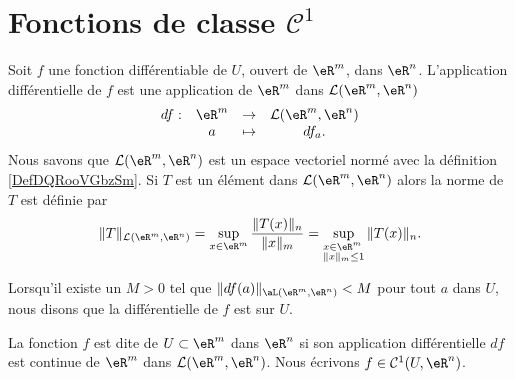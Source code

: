 
\section{Fonctions de classe $\mathcal{C}^1$}

Soit $f$ une fonction différentiable de $U$, ouvert de $\eR^m$, dans $\eR^n$. L'application différentielle de $f$ est une application  de $\eR^m$ dans $\mathcal{L}(\eR^m, \eR^n)$ 
\begin{equation}
  \begin{array}{rccc}
    df : & \eR^m & \to & \mathcal{L}(\eR^m, \eR^n)\\
& a& \mapsto & df_a.
  \end{array}
\end{equation}
Nous savons que $\mathcal{L}(\eR^m, \eR^n)$ est un espace vectoriel normé avec la définition \ref{DefDQRooVGbzSm}. Si $T$ est un élément dans $\mathcal{L}(\eR^m, \eR^n)$ alors la norme de $T$ est définie par 
\[
\|T\|_{\mathcal{L}(\eR^m, \eR^n)}=\sup_{x\in\eR^m} \frac{\|T(x)\|_n}{\|x\|_m}=\sup_{\begin{subarray}{l}
    x\in\eR^m\\
\|x\|_m\leq 1
  \end{subarray}} \|T(x)\|_n.
\]

Lorsqu'il existe un $M>0$ tel que $\| df(a) \|_{\aL(\eR^m,\eR^n)}<M$ pour tout $a$ dans $U$, nous disons que la différentielle de $f$ est  sur $U$.

\begin{definition}
	La fonction $f$ est dite  de $U\subset\eR^m$  dans $\eR^n$ si son application différentielle $df$ est continue de $\eR^m$ dans $\mathcal{L}(\eR^m, \eR^n)$. Nous écrivons $f\in\mathcal{C}^1(U,\eR^n)$.
\end{definition}

